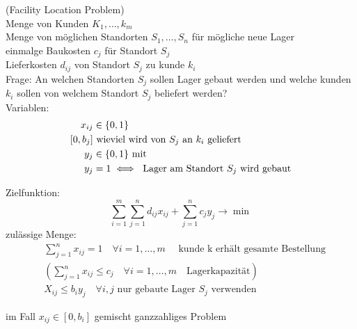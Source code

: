 \begin{beispiel}
	(Facility Location Problem)\\
	Menge von Kunden $K_{1},\dots,k_{m}$\\
	Menge von möglichen Standorten $S_{1},\dots, S_{n}$ für mögliche neue Lager\\
	einmalge Baukosten $c_{j}$ für Standort $S_{j}$\\
	Lieferkosten $d_{ij}$ von Standort $S_{j}$ zu kunde $k_{i}$\\
	Frage: An welchen Standorten $S_{j}$ sollen Lager gebaut werden und welche kunden $k_{i}$ sollen von welchem Standort $S_{j}$ beliefert werden?\\
	Variablen:
	\begin{align*}
		x_{ij}&\in \{0,1\} \\
		\left[0,b_{j} \right]& \text{ wieviel wird von $S_{j}$ an $k_{i}$ geliefert}\\
		y_{j} &\in \{0,1\}\text{ mit }  \\
		y_{j}& = 1 \iff \text{ Lager am Standort $ S_{j}$ wird gebaut}
	\end{align*} 

	Zielfunktion: 
	\begin{equation*}
		\sum_{i=1}^{m} \sum_{j=1}^{n}  d_{ij}x_{ij} + \sum_{j=1}^{n} c_{j}y_{j} \rightarrow \min
	\end{equation*} 
	zulässige Menge:	
	\begin{align*}
		&\sum_{j=1}^{n} x_{ij} =1 \quad \forall i=1,\dots, m\quad \text{ kunde k erhält gesamte Bestellung}\\
		&\left(\sum_{j=1}^{n} x_{ij} \leq c_{j} \quad \forall i=1,\dots, m \quad \text{Lagerkapazität}\right)\\
		&X_{ij} \leq b_{i}y_{j} \quad \forall i,j \text{ nur gebaute Lager $S_{j}$ verwenden}
	\end{align*} 

	im Fall $x_{ij} \in [0,b_{i}]$ gemischt ganzzahliges Problem

\end{beispiel}

